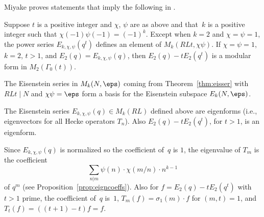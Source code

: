 Miyake proves statements that imply the following in
\cite[Ch.~7]{miyake}. 
\begin{theorem}\label{thm:eisser}
Suppose $t$ is a positive integer and $\chi$, $\psi$ are as above
and that~$k$ is a positive integer such that $\chi(-1)\psi(-1) = (-1)^k$.
Except when $k=2$ and $\chi=\psi=1$, the power series 
$E_{k,\chi,\psi}(q^t)$ defines an element of 
$M_k(RLt,\chi \psi)$.
If $\chi=\psi=1$, $k=2$, $t>1$,  and $E_2(q) = E_{k,\chi,\psi}(q)$, then 
$E_2(q) - t E_2(q^t)$ is a modular form in $M_2(\Gamma_0(t))$.
\end{theorem}

\begin{theorem}\label{thm:eisgen}
  The Eisenstein series in $M_k(N, \eps)$ coming from
  Theorem~\ref{thm:eisser} with $RLt \mid N$ and $\chi \psi = \eps$
  form a basis for the
  Eisenstein subspace $E_k(N,\eps)$.
\end{theorem}

\begin{theorem}\label{thm:eiseigen}
The Eisenstein series 
$E_{k,\chi,\psi}(q) \in M_k(RL)$ defined above
are eigenforms (i.e., eigenvectors for all Hecke operators $T_n$).  
Also $E_2(q) - t E_2(q^t)$, for $t>1$, is an eigenform.
\end{theorem}
Since $E_{k,\chi,\psi}(q)$ is normalized so the coefficient
of~$q$ is $1$, the eigenvalue of $T_m$  is  the coefficient
$$\sum_{n|m} \psi(n) \cdot \chi(m/n) \cdot n^{k-1}$$
of $q^m$ (see Proposition~\ref{prop:eigncoeffs}).
Also for $f = E_2(q) - t E_2(q^t)$ with $t>1$ prime, the coefficient of~$q$ 
is~$1$, $T_m(f) = \sigma_{1}(m)\cdot f$ for $(m,t)=1$, and $T_t(f) = 
((t+1)-t)f = f$.

